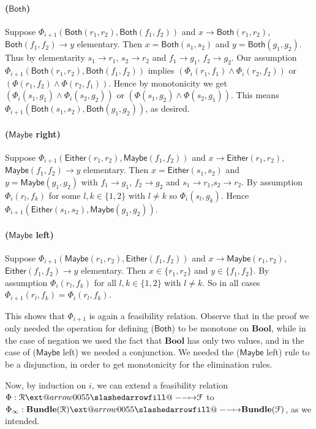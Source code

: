 \documentclass[12pt]{article}
\makeatletter
\theoremstyle{definition}
\theoremstyle{plain}
\theoremstyle{plain}
\theoremstyle{plain}
\theoremstyle{plain}
\theoremstyle{remark}
\theoremstyle{remark}
\newcommand{\mc}[1]{\mathcal{#1}}
\newcommand{\maybe}{\mathsf{Maybe}}
\newcommand{\either}{\mathsf{Either}}
\newcommand{\both}{\mathsf{Both}}
\def\slashedarrowfill@#1#2#3#4#5{%
	$\m@th\thickmuskip0mu\medmuskip\thickmuskip\thinmuskip\thickmuskip
	\relax#5#1\mkern-7mu%
	\cleaders\hbox{$#5\mkern-2mu#2\mkern-2mu$}\hfill
	\mathclap{#3}\mathclap{#2}%
	\cleaders\hbox{$#5\mkern-2mu#2\mkern-2mu$}\hfill
	\mkern-7mu#4$%
}
\def\rightslashedarrowfill@{%
	\slashedarrowfill@\relbar\relbar\mapstochar\rightarrow}
\newcommand\xslashedrightarrow[2][]{%
	\ext@arrow 0055{\rightslashedarrowfill@}{#1}{#2}}
\makeatother
\begin{document}
\paragraph{($\both$)} Suppose $\Phi_{i+1}(\both(r_1,r_2),\both(f_1,f_2))$ and $x \rightarrow \both(r_1,r_2)$, $\both(f_1,f_2) \rightarrow y$ elementary. Then $x = \both(s_1,s_2)$ and $y = \both(g_1,g_2)$. Thus by elementarity $s_1 \rightarrow r_1$, $s_2 \rightarrow r_2$ and $f_1 \rightarrow g_1$, $f_2 \rightarrow g_2$. Our assumption $\Phi_{i+1}(\both(r_1,r_2),\both(f_1,f_2))$ implies $(\Phi_i(r_1,f_1) \wedge \Phi_i(r_2,f_2))$ or $(\Phi(r_1,f_2) \wedge \Phi(r_2,f_1))$. Hence by monotonicity we get $(\Phi_i(s_1,g_1) \wedge \Phi_i(s_2,g_2))$ or $(\Phi(s_1,g_2) \wedge \Phi(s_2,g_1))$. This means $\Phi_{i+1}(\both(s_1,s_2),\both(g_1,g_2))$, as desired.

\paragraph{($\maybe$ right)} Suppose $\Phi_{i+1}(\either(r_1,r_2),\maybe(f_1,f_2))$ and $x \rightarrow \either(r_1,r_2)$, $\maybe(f_1,f_2) \rightarrow y$ elementary. Then $x = \either(s_1,s_2)$ and $y = \maybe(g_1,g_2)$ with $f_1 \rightarrow g_1$, $f_2 \rightarrow g_2$ and $s_1 \rightarrow r_1$,$s_2 \rightarrow r_2$. By assumption $\Phi_i(r_l,f_k)$ for some $l,k \in \{1,2\}$ with $l \neq k$ so $\Phi_i(s_l,g_k)$. Hence $\Phi_{i+1}(\either(s_1,s_2),\maybe(g_1,g_2))$.

\paragraph{($\maybe$ left)} Suppose $\Phi_{i+1}(\maybe(r_1,r_2),\either(f_1,f_2))$ and $x \rightarrow \maybe(r_1,r_2)$, $\either(f_1,f_2) \rightarrow y$ elementary. Then $x \in \{r_1,r_2\}$ and $y \in \{f_1,f_2\}$. By assumption $\Phi_i(r_l,f_k)$ for all $l,k \in \{1,2\}$ with $l \neq k$. So in all cases $\Phi_{i+1}(r_l,f_k) = \Phi_{i}(r_l,f_k)$.

This shows that $\Phi_{i+1}$ is again a feasibility relation. Observe that in the proof we only needed the operation for defining ($\both$) to be monotone on $\mathbf{Bool}$, while in the case of negation we used the fact that $\mathbf{Bool}$ has only two values, and in the case of ($\maybe$ left) we needed a conjunction. We needed the ($\maybe$ left) rule to be a disjunction, in order to get monotonicity for the elimination rules.

Now, by induction on $i$, we can extend a feasibility relation $\Phi: \mc{R} \xslashedrightarrow{} \mc{F}$ to $\Phi_\infty: \mathbf{Bundle}(\mc{R}) \xslashedrightarrow{} \mathbf{Bundle}(\mc{F})$, as we intended.
\end{document}
